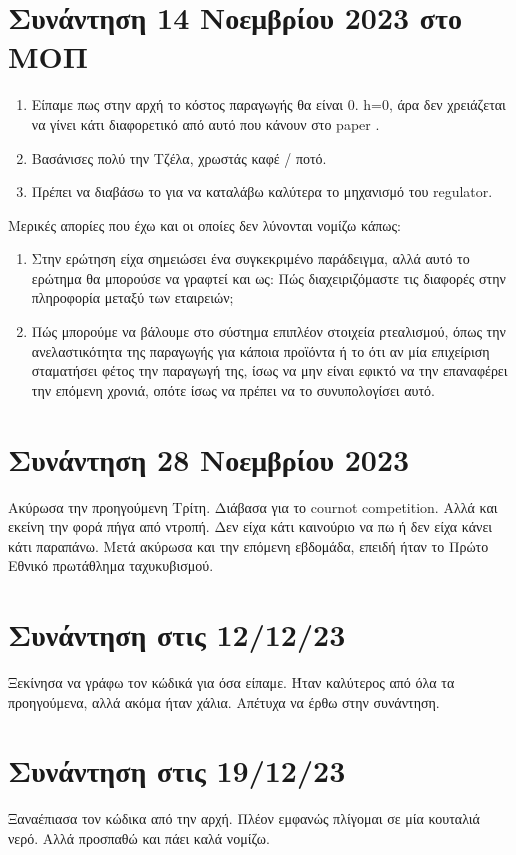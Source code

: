 \documentclass[a4paper,twoside,10pt]{article}
\begin{document}
\section{Συνάντηση 14 Νοεμβρίου 2023 στο ΜΟΠ}
\begin{enumerate}
	\item Είπαμε πως στην αρχή το κόστος παραγωγής θα είναι 0. h=0, άρα δεν χρειάζεται να γίνει κάτι διαφορετικό από αυτό που κάνουν στο paper \cite{Allocating}.
	\item Βασάνισες πολύ την Τζέλα, χρωστάς καφέ / ποτό.
	\item Πρέπει να διαβάσω το \cite{Allocating} για να καταλάβω καλύτερα το μηχανισμό του regulator. 
\end{enumerate}  

Μερικές απορίες που έχω και οι οποίες δεν λύνονται νομίζω κάπως:
\begin{enumerate}
	\item Στην ερώτηση είχα σημειώσει ένα συγκεκριμένο παράδειγμα, αλλά αυτό το ερώτημα θα μπορούσε να γραφτεί και ως: Πώς διαχειριζόμαστε τις διαφορές στην πληροφορία μεταξύ των εταιρειών;
	\item Πώς μπορούμε να βάλουμε στο σύστημα επιπλέον στοιχεία ρτεαλισμού, όπως την ανελαστικότητα της παραγωγής για κάποια προϊόντα ή το ότι αν μία επιχείριση σταματήσει φέτος την παραγωγή της, ίσως να μην είναι εφικτό να την επαναφέρει την επόμενη χρονιά, οπότε ίσως να πρέπει να το συνυπολογίσει αυτό.

\end{enumerate} 

\section{Συνάντηση 28 Νοεμβρίου 2023}
Ακύρωσα την προηγούμενη Τρίτη. 
Διάβασα για το cournot competition.
Αλλά και εκείνη την φορά πήγα από ντροπή. Δεν είχα κάτι καινούριο να πω ή δεν είχα κάνει κάτι παραπάνω.
Μετά ακύρωσα και την επόμενη εβδομάδα, επειδή ήταν το Πρώτο Εθνικό πρωτάθλημα ταχυκυβισμού. 


\section{Συνάντηση στις 12/12/23}
Ξεκίνησα να γράφω τον κώδικά για όσα είπαμε. Ήταν καλύτερος από όλα τα προηγούμενα, αλλά ακόμα ήταν χάλια. Απέτυχα να έρθω στην συνάντηση.


\section{Συνάντηση στις 19/12/23}
Ξαναέπιασα τον κώδικα από την αρχή. Πλέον εμφανώς πλίγομαι σε μία κουταλιά νερό. Αλλά προσπαθώ και πάει καλά νομίζω.
\end{document}
